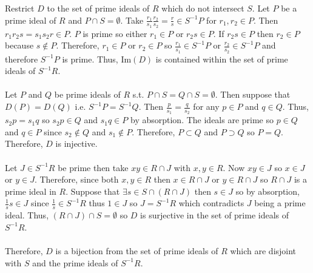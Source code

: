 \documentclass[12pt]{extarticle}
\renewcommand{\Im}[1]{\mathrm{Im}\left( #1 \right)}
\begin{document}
\begin{enumerate}
\begin{enumerate}
Restrict $D$ to the set of prime ideals of $R$ which do not intersect $S$. Let $P$ be a prime ideal of $R$ and $P \cap S = \emptyset$. Take $\frac{r_1}{s_1} \frac{r_2}{s_2} = \frac{r}{s} \in S^{-1} P$ for $r_1, r_2 \in P$. Then $r_1 r_2 s = s_1 s_2 r \in P$. $P$ is prime so either $r_1 \in P$ or $r_2 s \in P$. If $r_2 s \in P$ then $r_2 \in P$ because $s \notin P$. Therefore, $r_1 \in P$ or $r_2 \in P$ so $\frac{r_1}{s_1} \in S^{-1}P$ or $\frac{r_2}{s_2} \in S^{-1} P$ and therefore $S^{-1} P$ is prime. Thus, $\Im{D}$ is contained within the set of prime ideals of $S^{-1} R$. \\ \\

Let $P$ and $Q$ be prime ideals of $R$ s.t. $P \cap S = Q \cap S = \emptyset$. Then suppose that $D(P) = D(Q)$ i.e. $S^{-1}P = S^{-1}Q$. Then $\frac{p}{s_1} = \frac{q}{s_2}$ for any $p \in P$ and $q \in Q$. Thus, $s_2 p = s_1 q$ so $s_2 p \in Q$ and $s_1 q \in P$ by absorption. The ideals are prime so $p \in Q$ and $q \in P$ since $s_2 \notin Q$ and $s_1 \notin P$. Therefore, $P \subset Q$ and $P \supset Q$ so $P = Q$. Therefore, $D$ is injective. \\ \\

Let $J \in S^{-1}R$ be prime then take $xy \in R \cap J$ with $x,y \in R$. Now $xy \in J$ so $x \in J$ or $y \in J$. Therefore, since both $x,y \in R$ then $x \in R \cap J$ or $y \in R \cap J$ so $R \cap J$ is a prime ideal in $R$. Suppose that $\exists s \in S \cap (R \cap J)$ then $s \in J$ so by absorption, $\frac{1}{s} s \in J$ since $\frac{1}{s} \in S^{-1} R$ thus $1 \in J$ so $J = S^{-1}R$ which contradicts $J$ being a prime ideal. Thus, $(R \cap J) \cap S  = \emptyset$ so $D$ is surjective in the set of prime ideals of $S^{-1}R$. \\ \\
Therefore, $D$ is a bijection from the set of prime ideals of $R$ which are disjoint with $S$ and the prime ideals of $S^{-1}R$. 


\end{enumerate}
\end{enumerate}
\end{document}
